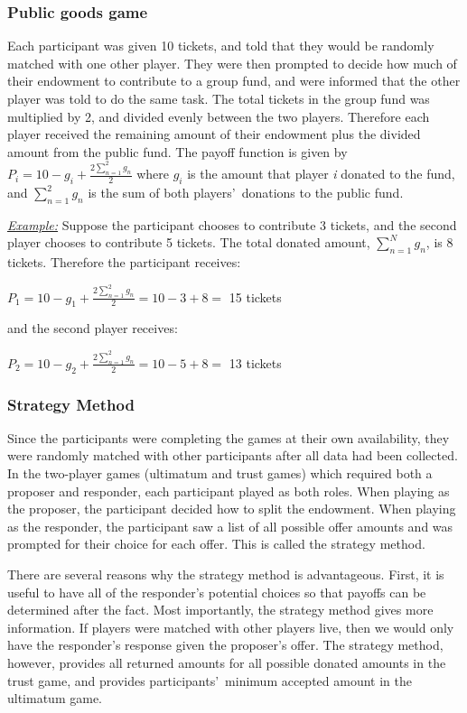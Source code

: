 \documentclass[12pt]{article}
\begin{document}
	
\subsubsection{Public goods game}

Each participant was given 10 tickets, and told that they would be randomly matched with one other player. They were then prompted to decide how much of their endowment to contribute to a group fund, and were informed that the other player was told to do the same task. The total tickets in the group fund was multiplied by 2, and divided evenly between the two players. Therefore each player received the remaining amount of their endowment plus the divided amount from the public fund. The payoff function is given by \( P_{i} = 10 - g_{i} + \frac{2\sum_{n=1}^{2} g_{n}}{2} \) where \(g_{i}\) is the amount that player \textit{i} donated to the fund, and \(\sum_{n=1}^{2}g_{n}\) is the sum of both players\rq \ donations to the public fund.

\underline{\textit{Example:}} Suppose the participant chooses to contribute 3 tickets, and the second player chooses to contribute 5 tickets. The total donated amount, \(\sum_{n=1}^{N} g_{n}\), is 8 tickets. Therefore the participant receives: 

\( P_{1} = 10 - g_{1} +  \frac{2\sum_{n=1}^{2} g_{n}}{2} = 10 - 3 + 8  = \) 15 tickets 

\noindent and the second player receives: 

\( P_{2} = 10 - g_{2} +  \frac{2\sum_{n=1}^{2} g_{n}}{2} = 10 - 5 + 8 = \) 13 tickets 


\subsubsection{Strategy Method}

Since the participants were completing the games at their own availability, they were randomly matched with other participants after all data had been collected. In the two-player games (ultimatum and trust games) which required both a proposer and responder, each participant played as both roles. When playing as the proposer, the participant decided how to split the endowment. When playing as the responder, the participant saw a list of all possible offer amounts and was prompted for their choice for each offer. This is called the strategy method.

There are several reasons why the strategy method is advantageous. First, it is useful to have all of the responder\rq s potential choices so that payoffs can be determined after the fact. Most importantly, the strategy method gives more information. If players were matched with other players live, then we would only have the responder\rq s response given the proposer\rq s offer. The strategy method, however, provides all returned amounts for all possible donated amounts in the trust game, and provides participants\rq \ minimum accepted amount in the ultimatum game. 
\end{document}
